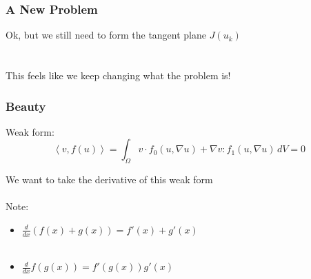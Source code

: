 \documentclass{beamer}
\begin{document}
\begin{frame}
\begin{center}
\frametitle{A New Problem}

Ok, but we still need to form the tangent plane $J \left( u_k \right)$\\

~\\

~\\

This feels like we keep changing what the problem is!

\end{center}
\end{frame}


\begin{frame}
\begin{center}
\frametitle{Beauty}

Weak form:\\

\begin{equation*}
\left\langle v, f \left( u \right) \right\rangle = \int_\Omega v \cdot f_0 \left( u, \nabla u \right) + \nabla v : f_1 \left( u, \nabla u \right) \, dV = 0
\end{equation*}

We want to take the derivative of this weak form\\

~\\

Note:

\begin{itemize}

\item $\frac{d}{dx} \left( f \left( x \right) + g \left( x \right) \right) = f' \left( x \right) + g' \left( x \right)$\\

~\\

\item $\frac{d}{dx} f \left( g \left( x \right) \right) = f' \left( g \left( x \right) \right) g' \left( x \right)$

\end{itemize}

\end{center}
\end{frame}

\end{document}
